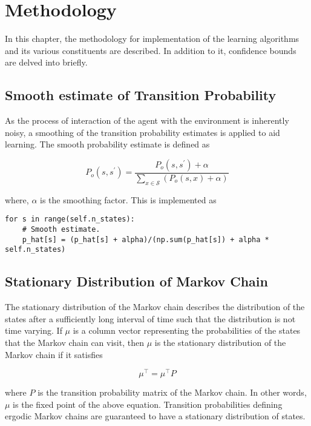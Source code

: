 \chapter{Methodology}

In this chapter, the methodology for implementation of the learning algorithms and its various constituents are described.
In addition to it, confidence bounds are delved into briefly.

\section{Smooth estimate of Transition Probability}

As the process of interaction of the agent with the environment is inherently noisy, a smoothing of the transition probability estimates is applied to aid learning.
The smooth probability estimate is defined as

\begin{equation}
    P_o(s, s^\prime) = \frac{P_o(s, s^\prime) + \alpha}{\sum_{x \in \mathcal{S}} \left(P_o(s, x) + \alpha \right)}
\end{equation}

where, $\alpha$ is the smoothing factor. This is implemented as

\begin{verbatim}
for s in range(self.n_states):
    # Smooth estimate.
    p_hat[s] = (p_hat[s] + alpha)/(np.sum(p_hat[s]) + alpha * self.n_states)
\end{verbatim}



\section{Stationary Distribution of Markov Chain}

The stationary distribution of the Markov chain describes the distribution of the states after a sufficiently long interval of time such that the distribution is not time varying.
If $\mu$ is a column vector representing the probabilities of the states that the Markov chain can visit, then $\mu$ is the stationary distribution of the Markov chain if it satisfies 

\begin{equation}
    \label{eqn:mu_estimate}
    \mu^\top = \mu^\top P
\end{equation}


where $P$ is the transition probability matrix of the Markov chain. 
In other words, $\mu$ is the fixed point of the above equation.
Transition probabilities defining ergodic Markov chains are guaranteed to have a stationary distribution of states.

